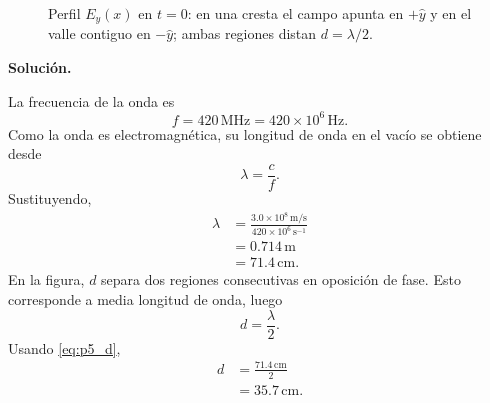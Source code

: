 \documentclass[11pt]{article}
\newcommand{\soluciontitulo}{%
    \par\medskip
    \noindent\textbf{Soluci\'on.}\par
    \smallskip
}
\begin{document}
\begin{figure}[H]
\centering
{}
\caption{Perfil $E_y(x)$ en $t=0$: en una cresta el campo apunta en $+\hat y$ y en el valle contiguo en $-\hat y$; ambas regiones distan $d=\lambda/2$.}
\end{figure}

\soluciontitulo

La frecuencia de la onda es
\begin{equation*}
    f=420\,\mathrm{MHz}=420\times10^6\,\mathrm{Hz}.
\end{equation*}
Como la onda es electromagn\'etica, su longitud de onda en el vac\'io se obtiene desde
\begin{equation}
    \lambda=\frac{c}{f}.
    \label{eq:p5_lambda}
\end{equation}
Sustituyendo,
\begin{align*}
    \lambda&=\frac{3.0\times10^8\,\mathrm{m/s}}{420\times10^6\,\mathrm{s^{-1}}}\\
            &=0.714\,\mathrm{m}\\
            &=71.4\,\mathrm{cm}.
\end{align*}
En la figura, $d$ separa dos regiones consecutivas en oposici\'on de fase. Esto corresponde a media longitud de onda, luego
\begin{equation}
    d=\frac{\lambda}{2}.
    \label{eq:p5_d}
\end{equation}
Usando \eqref{eq:p5_d},
\begin{align*}
    d&=\frac{71.4\,\mathrm{cm}}{2}\\
     &=35.7\,\mathrm{cm}.
\end{align*}
\end{document}
